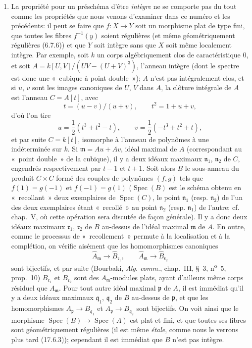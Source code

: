 \begin{remarks}[6.5.5]
\begin{enumerate}
\item[(ii)] La propriété pour un préschéma d'être \emph{intègre} ne se
comporte pas du tout comme les propriétés que nous venons d'examiner dans
ce numéro et les précédents: il peut se faire que
$f:X\to Y$ soit un morphisme plat de type fini, que toutes les fibres
$f^{-1}(y)$ soient régulières (et même géométriquement régulières (6.7.6))
et que $Y$ soit intègre sans que $X$ soit même localement intègre.
Par exemple, soit $k$ un corps algébriquement clos de caractéristique $0$,
et soit $A=k[U,V]/(UV-(U+V)^3)$, l'anneau intègre (dont le spectre est
donc une «~cubique à point double~»); $A$ n'est pas intégralement clos,
et si $u$, $v$ sont les images canoniques de $U$, $V$ dans $A$, la clôture
intégrale de $A$ est l'anneau $C=A[t]$, avec
\[
t=(u-v)/(u+v),\qquad t^2=1+u+v,
\]
d'où l'on tire
\[
u=\frac{1}{2}(t^3+t^2-t),\qquad
v=\frac{1}{2}(-t^3+t^2+t),
\]
et par suite $C=k[t]$, isomorphe à l'anneau de polynômes à une
indéterminée sur $k$. Si $\mathfrak m=Au+Av$, idéal maximal de $A$
(correspondant au «~point double~» de la cubique), il y a deux idéaux
maximaux $\mathfrak n_1$, $\mathfrak n_2$ de $C$, engendrés respectivement
par $t-1$ et $t+1$. Soit alors $B$ le sous-anneau du produit $C\times C$
formé des couples de polynômes $(f,g)$ tels que
$f(1)=g(-1)$ et $f(-1)=g(1)$
($\operatorname{Spec}(B)$ est le schéma obtenu en «~recollant~» deux
exemplaires de $\operatorname{Spec}(C)$, le point $\mathfrak n_1$
(resp. $\mathfrak n_2$) de l'un des deux exemplaires étant «~recollé~»
au point $\mathfrak n_2$ (resp. $\mathfrak n_1$) de l'autre; cf. chap.~V,
où cette opération sera discutée de façon générale). Il y a donc deux
idéaux maximaux $\mathfrak r_1$, $\mathfrak r_2$ de $B$ au-dessus de
l'idéal maximal $\mathfrak m$ de $A$. En outre, comme le processus de
«~recollement~» permute à la localisation et à la complétion, on vérifie
aisément que les homomorphismes canoniques
\[
\widehat A_{\mathfrak m}\to\widehat B_{\mathfrak r_1},
\qquad
\widehat A_{\mathfrak m}\to\widehat B_{\mathfrak r_2}
\]
sont bijectifs, et par suite (Bourbaki, \emph{Alg. comm.}, chap.~III,
\S~3, n\textsuperscript{o}~5, prop.~10) $B_{\mathfrak r_1}$ et
$B_{\mathfrak r_2}$ sont des $A_{\mathfrak m}$-modules plats, ayant
d'ailleurs même corps résiduel que $A_{\mathfrak m}$. Pour tout autre idéal
maximal $\mathfrak p$ de $A$, il est immédiat qu'il y a deux idéaux
maximaux $\mathfrak q_1$, $\mathfrak q_2$ de $B$ au-dessus de $\mathfrak p$,
et que les homomorphismes
$A_{\mathfrak p}\to B_{\mathfrak q_1}$ et
$A_{\mathfrak p}\to B_{\mathfrak q_2}$ sont bijectifs. On voit ainsi que
le morphisme $\operatorname{Spec}(B)\to\operatorname{Spec}(A)$ est plat
et fini, et que toutes ses fibres sont géométriquement régulières (il est
même \emph{\'etale}, comme nous le verrons plus tard (17.6.3)); cependant
il est immédiat que $B$ n'est pas intègre.
\end{enumerate}
\end{remarks}

